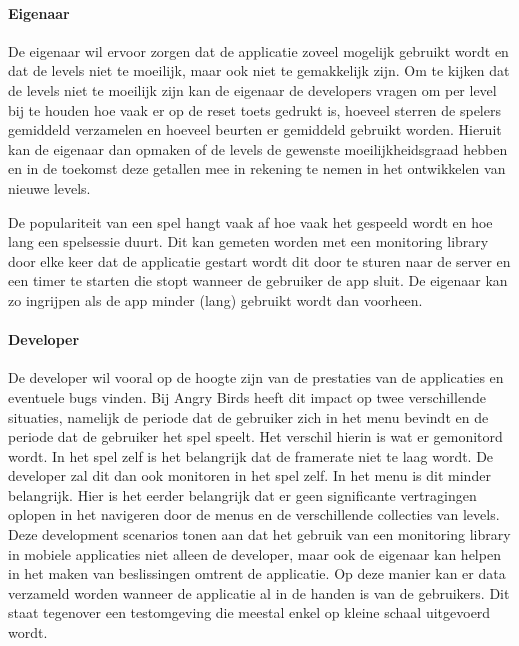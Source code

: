 \paragraph{Eigenaar}
De eigenaar wil ervoor zorgen dat de applicatie zoveel mogelijk gebruikt wordt en dat de levels niet te moeilijk, maar ook niet te gemakkelijk zijn. Om te kijken dat de levels niet te moeilijk zijn kan de eigenaar de developers vragen om per level bij te houden hoe vaak er op de reset toets gedrukt is, hoeveel sterren de spelers gemiddeld verzamelen en hoeveel beurten er gemiddeld gebruikt worden. Hieruit kan de eigenaar dan opmaken of de levels de gewenste moeilijkheidsgraad hebben en in de toekomst deze getallen mee in rekening te nemen in het ontwikkelen van nieuwe levels.

De populariteit van een spel hangt vaak af hoe vaak het gespeeld wordt en hoe lang een spelsessie duurt. Dit kan gemeten worden met een monitoring library door elke keer dat de applicatie gestart wordt dit door te sturen naar de server en een timer te starten die stopt wanneer de gebruiker de app sluit. De eigenaar kan zo ingrijpen als de app minder (lang) gebruikt wordt dan voorheen. \\

\paragraph{Developer}
De developer wil vooral op de hoogte zijn van de prestaties van de applicaties en eventuele bugs vinden. Bij Angry Birds heeft dit impact op twee verschillende situaties, namelijk de periode dat de gebruiker zich in het menu bevindt en de periode dat de gebruiker het spel speelt. Het verschil hierin is wat er gemonitord wordt. In het spel zelf is het belangrijk dat de framerate niet te laag wordt. De developer zal dit dan ook monitoren in het spel zelf. In het menu is dit minder belangrijk. Hier is het eerder belangrijk dat er geen significante vertragingen oplopen in het navigeren door de menus en de verschillende collecties van levels.\\


Deze development scenarios tonen aan dat het gebruik van een monitoring library in mobiele applicaties niet alleen de developer, maar ook de eigenaar kan helpen in het maken van beslissingen omtrent de applicatie. Op deze manier kan er data verzameld worden wanneer de applicatie al in de handen is van de gebruikers. Dit staat tegenover een testomgeving die meestal enkel op kleine schaal uitgevoerd wordt.






